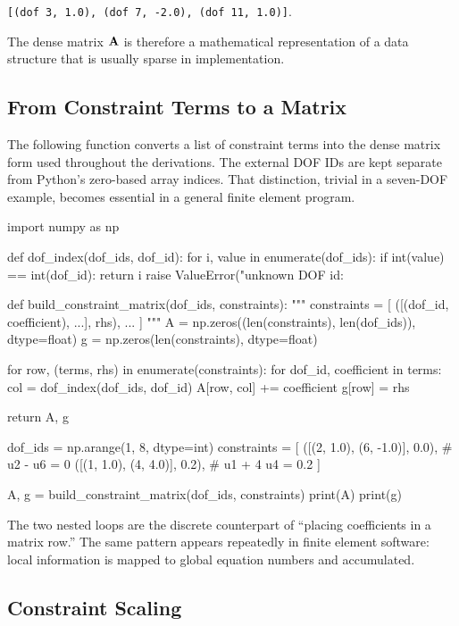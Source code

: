 \begin{center}
\texttt{[(dof 3, 1.0), (dof 7, -2.0), (dof 11, 1.0)]}.
\end{center}

The dense matrix $\mathbf{A}$ is therefore a mathematical representation of a data
structure that is usually sparse in implementation.

\subsection{From Constraint Terms to a Matrix}

The following function converts a list of constraint terms into the dense matrix
form used throughout the derivations. The external DOF IDs are kept separate
from Python's zero-based array indices. That distinction, trivial in a seven-DOF
example, becomes essential in a general finite element program.

\begin{python}
import numpy as np


def dof_index(dof_ids, dof_id):
    for i, value in enumerate(dof_ids):
        if int(value) == int(dof_id):
            return i
    raise ValueError("unknown DOF id: %


def build_constraint_matrix(dof_ids, constraints):
    """
    constraints = [
        ([(dof_id, coefficient), ...], rhs),
        ...
    ]
    """
    A = np.zeros((len(constraints), len(dof_ids)), dtype=float)
    g = np.zeros(len(constraints), dtype=float)

    for row, (terms, rhs) in enumerate(constraints):
        for dof_id, coefficient in terms:
            col = dof_index(dof_ids, dof_id)
            A[row, col] += coefficient
        g[row] = rhs

    return A, g


dof_ids = np.arange(1, 8, dtype=int)
constraints = [
    ([(2, 1.0), (6, -1.0)], 0.0),       # u2 - u6 = 0
    ([(1, 1.0), (4, 4.0)], 0.2),        # u1 + 4 u4 = 0.2
]

A, g = build_constraint_matrix(dof_ids, constraints)
print(A)
print(g)
\end{python}

The two nested loops are the discrete counterpart of ``placing coefficients in
a matrix row.'' The same pattern appears repeatedly in finite element software:
local information is mapped to global equation numbers and accumulated.

\subsection{Constraint Scaling}

